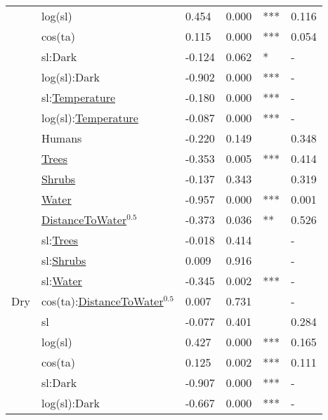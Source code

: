 \begin{tabular}[t]{llllll}
 & log(sl) & 0.454 & 0.000 & *** & 0.116\\

 & cos(ta) & 0.115 & 0.000 & *** & 0.054\\

 & sl:Dark & -0.124 & 0.062 & * & -\\

 & log(sl):Dark & -0.902 & 0.000 & *** & -\\

 & sl:\underline{Temperature} & -0.180 & 0.000 & *** & -\\

 & log(sl):\underline{Temperature} & -0.087 & 0.000 & *** & -\\

 & Humans & -0.220 & 0.149 &  & 0.348\\

 & \underline{Trees} & -0.353 & 0.005 & *** & 0.414\\

 & \underline{Shrubs} & -0.137 & 0.343 &  & 0.319\\

 & \underline{Water} & -0.957 & 0.000 & *** & 0.001\\

 & \underline{DistanceToWater}$^{0.5}$ & -0.373 & 0.036 & ** & 0.526\\

 & sl:\underline{Trees} & -0.018 & 0.414 &  & -\\

 & sl:\underline{Shrubs} & 0.009 & 0.916 &  & -\\

 & sl:\underline{Water} & -0.345 & 0.002 & *** & -\\

\multirow{-16}{*}{\raggedright\arraybackslash Dry} & cos(ta):\underline{DistanceToWater}$^{0.5}$ & 0.007 & 0.731 &  & -\\
\cmidrule{1-6}
 & sl & -0.077 & 0.401 &  & 0.284\\

 & log(sl) & 0.427 & 0.000 & *** & 0.165\\

 & cos(ta) & 0.125 & 0.002 & *** & 0.111\\

 & sl:Dark & -0.907 & 0.000 & *** & -\\

 & log(sl):Dark & -0.667 & 0.000 & *** & -\\


\end{tabular}

